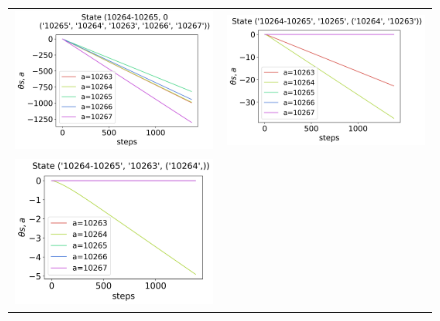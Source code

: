 \begin{figure}[!htp]
    \centering
    \begin{tabular}{cc}
        \includegraphics[scale=0.36,valign=b]{chapters/figures/theta_NPG_state_0.png} &
        \includegraphics[scale=0.36,valign=b]{chapters/figures/theta_NPG_state_1.png} \\
        \hspace*{9pt}\includegraphics[scale=0.36,valign=b]{chapters/figures/theta_NPG_state_2.png} &

\end{tabular}
\end{figure}
